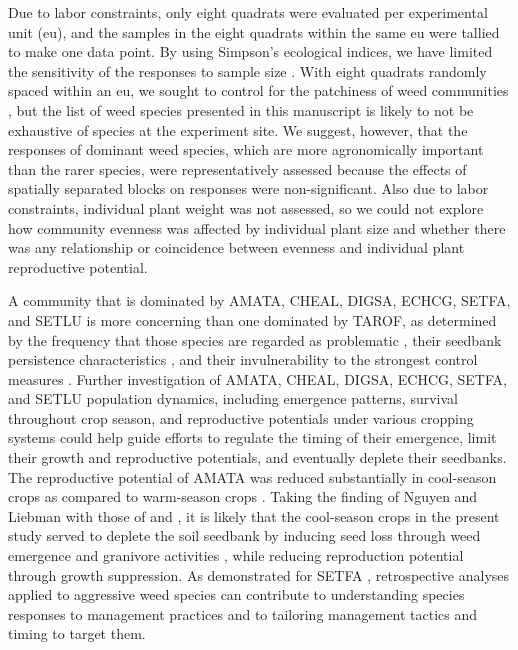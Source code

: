 \documentclass[
]{article}
\begin{document}
Due to labor constraints, only eight quadrats were evaluated per experimental unit (eu), and the samples in the eight quadrats within the same eu were tallied to make one data point. By using Simpson's ecological indices, we have limited the sensitivity of the responses to sample size \citep{nkoaWeedAbundanceDistribution2015}. With eight quadrats randomly spaced within an eu, we sought to control for the patchiness of weed communities \citep{cardinaNatureConsequenceWeed1997}, but the list of weed species presented in this manuscript is likely to not be exhaustive of species at the experiment site. We suggest, however, that the responses of dominant weed species, which are more agronomically important than the rarer species, were representatively assessed because the effects of spatially separated blocks on responses were non-significant. Also due to labor constraints, individual plant weight was not assessed, so we could not explore how community evenness was affected by individual plant size and whether there was any relationship or coincidence between evenness and individual plant reproductive potential.

A community that is dominated by AMATA, CHEAL, DIGSA, ECHCG, SETFA, and SETLU is more concerning than one dominated by TAROF, as determined by the frequency that those species are regarded as problematic \citep{krugerGrowerViewsProblematic2009, princeBenchmarkStudyIntroduction2012}, their seedbank persistence characteristics \citep{buhlerEmergencePersistenceSeed2001, davisEnvironmentalFactorsAffecting2005}, and their invulnerability to the strongest control measures \citep{mohlerWeedEvolutionCommunity2001, culpepperGlyphosateinducedWeedShifts2006}. Further investigation of AMATA, CHEAL, DIGSA, ECHCG, SETFA, and SETLU population dynamics, including emergence patterns, survival throughout crop season, and reproductive potentials under various cropping systems could help guide efforts to regulate the timing of their emergence, limit their growth and reproductive potentials, and eventually deplete their seedbanks. The reproductive potential of AMATA was reduced substantially in cool-season crops as compared to warm-season crops \citep{nguyenImpactCroppingSystemaccepted}. Taking the finding of Nguyen and Liebman with those of \citet{gabaAgroecologicalWeedControl2014} and \citet{weisbergerDoesDiversifyingCrop2019}, it is likely that the cool-season crops in the present study served to deplete the soil seedbank by inducing seed loss through weed emergence and granivore activities \citep{vanderlaatPostdispersalWeedSeed2015}, while reducing reproduction potential through growth suppression. As demonstrated for SETFA \citep{davisCroppingSystemEffects2003a}, retrospective analyses applied to aggressive weed species can contribute to understanding species responses to management practices and to tailoring management tactics and timing to target them.
\end{document}
